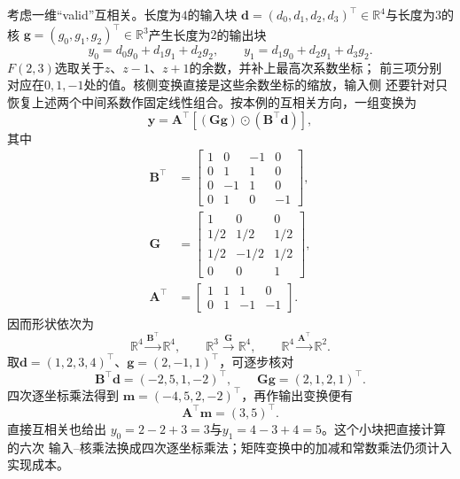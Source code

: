 \begin{example}
  \label{ex:signal-analysis-winograd-f23}
  考虑一维“valid”互相关。长度为\(4\)的输入块
  \(\bm d=(d_0,d_1,d_2,d_3)^{\top}\in\mathbb{R}^{4}\)与长度为\(3\)的核
  \(\bm g=(g_0,g_1,g_2)^{\top}\in\mathbb{R}^{3}\)产生长度为\(2\)的输出块
  \[
    y_0=d_0g_0+d_1g_1+d_2g_2,
    \qquad
    y_1=d_1g_0+d_2g_1+d_3g_2.
  \]
  \(F(2,3)\)选取关于\(z\)、\(z-1\)、\(z+1\)的余数，并补上最高次系数坐标；
  前三项分别对应在\(0,1,-1\)处的值。核侧变换直接是这些余数坐标的缩放，输入侧
  还要针对只恢复上述两个中间系数作固定线性组合。按本例的互相关方向，一组变换为
  \begin{equation}
    \bm y
    =
    \bm A^{\top}
    \left[
      (\bm G\bm g)\odot(\bm B^{\top}\bm d)
    \right],
    \label{eq:signal-analysis-winograd-f23}
  \end{equation}
  其中
  \begin{align*}
    \bm B^{\top}
    &=
    \begin{bmatrix}
      1&0&-1&0\\
      0&1&1&0\\
      0&-1&1&0\\
      0&1&0&-1
    \end{bmatrix},\\
    \bm G
    &=
    \begin{bmatrix}
      1&0&0\\
      1/2&1/2&1/2\\
      1/2&-1/2&1/2\\
      0&0&1
    \end{bmatrix},\\
    \bm A^{\top}
    &=
    \begin{bmatrix}
      1&1&1&0\\
      0&1&-1&-1
    \end{bmatrix}.
  \end{align*}
  因而形状依次为
  \[
    \mathbb{R}^{4}\xrightarrow{\bm B^{\top}}\mathbb{R}^{4},
    \qquad
    \mathbb{R}^{3}\xrightarrow{\bm G}\mathbb{R}^{4},
    \qquad
    \mathbb{R}^{4}\xrightarrow{\bm A^{\top}}\mathbb{R}^{2}.
  \]
  取\(\bm d=(1,2,3,4)^{\top}\)、\(\bm g=(2,-1,1)^{\top}\)，可逐步核对
  \[
    \bm B^{\top}\bm d=(-2,5,1,-2)^{\top},
    \qquad
    \bm G\bm g=(2,1,2,1)^{\top}.
  \]
  四次逐坐标乘法得到
  \(\bm m=(-4,5,2,-2)^{\top}\)，再作输出变换便有
  \[
    \bm A^{\top}\bm m=(3,5)^{\top}.
  \]
  直接互相关也给出
  \(y_0=2-2+3=3\)与\(y_1=4-3+4=5\)。这个小块把直接计算的六次
  输入--核乘法换成四次逐坐标乘法；矩阵变换中的加减和常数乘法仍须计入实现成本。
\end{example}

